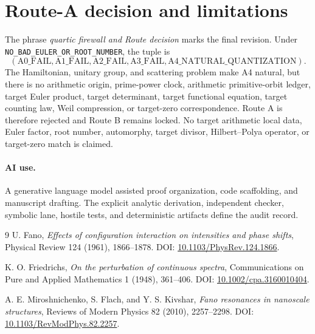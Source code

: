 \documentclass[9pt]{extarticle}
\begin{document}
\section{Route-A decision and limitations}
The phrase \emph{quartic firewall and Route decision} marks the final
revision.  Under \texttt{NO\_BAD\_EULER\_OR\_ROOT\_NUMBER}, the tuple is
\[
 (\mathrm{A0\_FAIL},\mathrm{A1\_FAIL},\mathrm{A2\_FAIL},
  \mathrm{A3\_FAIL},\mathrm{A4\_NATURAL\_QUANTIZATION}).
\]
The Hamiltonian, unitary group, and scattering problem make A4 natural, but
there is no arithmetic origin, prime-power clock, arithmetic primitive-orbit
ledger, target Euler product, target determinant, target functional equation,
target counting law, Weil compression, or target-zero correspondence.  Route
A is therefore rejected and Route B remains locked.  No target arithmetic
local data, Euler factor, root number, automorphy, target divisor,
Hilbert--Polya operator, or target-zero match is claimed.

\paragraph{AI use.}
A generative language model assisted proof organization, code scaffolding,
and manuscript drafting.  The explicit analytic derivation, independent
checker, symbolic lane, hostile tests, and deterministic artifacts define the
audit record.

\begingroup
\small
\begin{thebibliography}{9}
U. Fano,
\emph{Effects of configuration interaction on intensities and phase shifts},
Physical Review 124 (1961), 1866--1878.
DOI: \href{https://doi.org/10.1103/PhysRev.124.1866}%
{10.1103/PhysRev.124.1866}.

K. O. Friedrichs,
\emph{On the perturbation of continuous spectra},
Communications on Pure and Applied Mathematics 1 (1948), 361--406.
DOI: \href{https://doi.org/10.1002/cpa.3160010404}%
{10.1002/cpa.3160010404}.

A. E. Miroshnichenko, S. Flach, and Y. S. Kivshar,
\emph{Fano resonances in nanoscale structures},
Reviews of Modern Physics 82 (2010), 2257--2298.
DOI: \href{https://doi.org/10.1103/RevModPhys.82.2257}%
{10.1103/RevModPhys.82.2257}.
\end{thebibliography}
\endgroup
\fi
\end{document}
